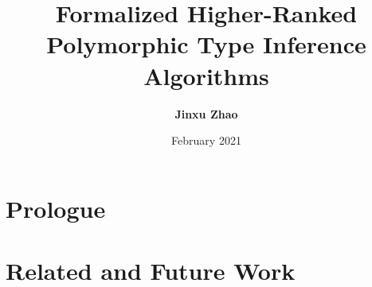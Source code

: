



\title{Formalized Higher-Ranked Polymorphic Type Inference Algorithms}
\author{\textbf{Jinxu Zhao}}
\date{February 2021}




\maketitle

\begin{abstract}
 
\end{abstract}


\frontmatter
\makedeclaration
\makeAck
\tableofcontents
\listoffigures
\listoftables

\mainmatter

\part{Prologue}





%
%
%
%
%
%
%
%
%







\part{Related and Future Work}

